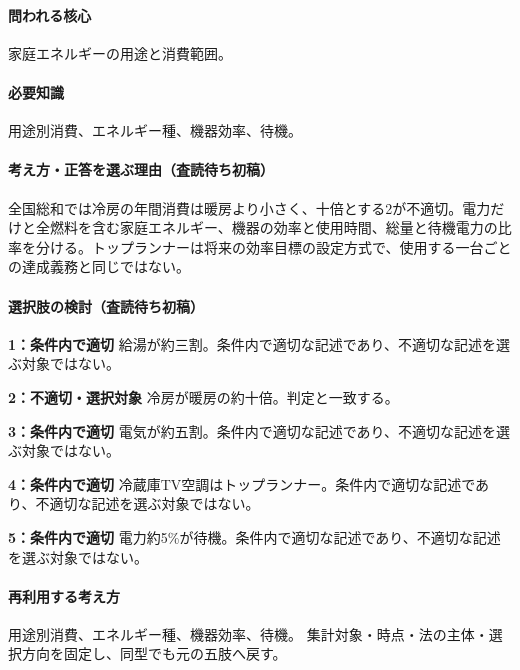 \paragraph{問われる核心} 家庭エネルギーの用途と消費範囲。

\paragraph{必要知識} 用途別消費、エネルギー種、機器効率、待機。

\paragraph{考え方・正答を選ぶ理由（査読待ち初稿）} 全国総和では冷房の年間消費は暖房より小さく、十倍とする2が不適切。電力だけと全燃料を含む家庭エネルギー、機器の効率と使用時間、総量と待機電力の比率を分ける。トップランナーは将来の効率目標の設定方式で、使用する一台ごとの達成義務と同じではない。

\paragraph{選択肢の検討（査読待ち初稿）}\mbox{}\par

\noindent\textbf{1：条件内で適切} 給湯が約三割。条件内で適切な記述であり、不適切な記述を選ぶ対象ではない。\par

\noindent\textbf{2：不適切・選択対象} 冷房が暖房の約十倍。判定と一致する。\par

\noindent\textbf{3：条件内で適切} 電気が約五割。条件内で適切な記述であり、不適切な記述を選ぶ対象ではない。\par

\noindent\textbf{4：条件内で適切} 冷蔵庫TV空調はトップランナー。条件内で適切な記述であり、不適切な記述を選ぶ対象ではない。\par

\noindent\textbf{5：条件内で適切} 電力約5\%が待機。条件内で適切な記述であり、不適切な記述を選ぶ対象ではない。\par

\paragraph{再利用する考え方} 用途別消費、エネルギー種、機器効率、待機。 集計対象・時点・法の主体・選択方向を固定し、同型でも元の五肢へ戻す。

